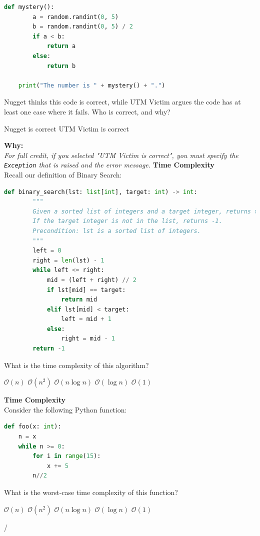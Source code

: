 \documentclass[letterpaper,12pt,addpoints]{exam}
\begin{document}
\begin{questions}
\begin{lstlisting}[language=Python, style=mystyle]
    def mystery():
        a = random.randint(0, 5)
        b = random.randint(0, 5) / 2
        if a < b:
            return a
        else:
            return b

    print("The number is " + mystery() + ".")
    \end{lstlisting}
    Nugget thinks this code is correct, while UTM Victim argues the code has at
    least one case where it fails. Who is correct, and why?
    \begin{choices}
        \choice Nugget is correct
        \choice UTM Victim is correct
    \end{choices}
    \textbf{Why:} \underline{\hspace{15cm}} \\
    \textit{For full credit, if you selected "UTM Victim is correct", you must specify the \texttt{Exception} that is raised and the error message.} \underline{\hspace{10cm}}
    \pagebreak
    \question[5] \textbf{Time Complexity} \\
    Recall our definition of Binary Search:
    \begin{lstlisting}[language=Python, style=mystyle]
    def binary_search(lst: list[int], target: int) -> int:
        """
        Given a sorted list of integers and a target integer, returns the index of the target integer in the list.
        If the target integer is not in the list, returns -1.
        Precondition: lst is a sorted list of integers.
        """
        left = 0
        right = len(lst) - 1
        while left <= right:
            mid = (left + right) // 2
            if lst[mid] == target:
                return mid
            elif lst[mid] < target:
                left = mid + 1
            else:
                right = mid - 1
        return -1
    \end{lstlisting}
    What is the time complexity of this algorithm?
    \begin{choices}
        \choice $\mathcal{O}(n)$
        \choice $\mathcal{O}(n^2)$
        \choice $\mathcal{O}(n\log n)$
        \choice $\mathcal{O}(\log n)$
        \choice $\mathcal{O}(1)$
    \end{choices}
    \question[5] \textbf{Time Complexity} \\
    Consider the following Python function:
    \begin{lstlisting}[language=Python, style=mystyle]
def foo(x: int):
    n = x
    while n >= 0:
        for i in range(15):
            x += 5
        n//2
    \end{lstlisting}
    What is the worst-case time complexity of this function?
    \begin{choices}
        \choice $\mathcal{O}(n)$
        \choice $\mathcal{O}(n^2)$
        \choice $\mathcal{O}(n\log n)$
        \choice $\mathcal{O}(\log n)$
        \choice $\mathcal{O}(1)$
    \end{choices}/
    \setcounter{question}{0}
    \clearpage

\end{questions}
\end{document}
